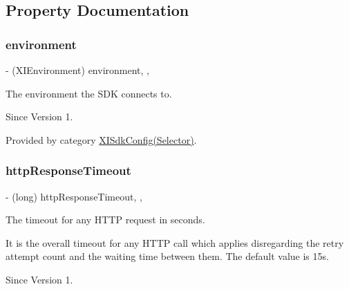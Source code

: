 \subsection{Property Documentation}
\hypertarget{class_x_i_sdk_config_acf4a6e964bf34ed131bd9b3a2324a186}{}\label{class_x_i_sdk_config_acf4a6e964bf34ed131bd9b3a2324a186} 
\subsubsection{\texorpdfstring{environment}{environment}}
{\footnotesize\ttfamily -\/ (X\+I\+Environment) environment\hspace{0.3cm}{\ttfamily [read]}, {\ttfamily [nonatomic]}, {\ttfamily [assign]}}



The environment the S\+DK connects to. 

\begin{DoxySince}{Since}
Version 1. 
\end{DoxySince}


Provided by category \hyperlink{category_x_i_sdk_config_07_selector_08_acf4a6e964bf34ed131bd9b3a2324a186}{X\+I\+Sdk\+Config(\+Selector)}.

\hypertarget{class_x_i_sdk_config_a721a1a7c8f44e42eb79defd955bf1d17}{}\label{class_x_i_sdk_config_a721a1a7c8f44e42eb79defd955bf1d17} 
\subsubsection{\texorpdfstring{http\+Response\+Timeout}{httpResponseTimeout}}
{\footnotesize\ttfamily -\/ (long) http\+Response\+Timeout\hspace{0.3cm}{\ttfamily [read]}, {\ttfamily [nonatomic]}, {\ttfamily [assign]}}



The timeout for any H\+T\+TP request in seconds. 

It is the overall timeout for any H\+T\+TP call which applies disregarding the retry attempt count and the waiting time between them. The default value is 15s. \begin{DoxySince}{Since}
Version 1. 
\end{DoxySince}
\hypertarget{class_x_i_sdk_config_a564301d822062bec6a8062f08f916661}{}\label{class_x_i_sdk_config_a564301d822062bec6a8062f08f916661} 
